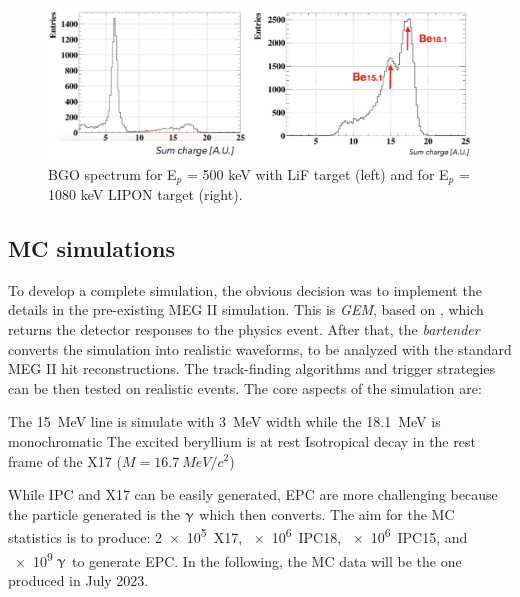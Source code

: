 \begin{refsection}
        \begin{figure}
            \centering
            \includegraphics[width=0.9\linewidth]{Figures//X17//X17_Feb2023/X17_BGO_targets.pdf}
            \caption[X17:BGO LiF and LIPON]{BGO spectrum for E$_p$ = 500 keV with LiF target (left) and  for E$_p$ = 1080 keV LIPON target (right).}
            \label{fig:X17:BGO:targets}
            \end{figure}
            
    \subsection{MC simulations}
        To develop a complete simulation, the obvious decision was to implement the details in the pre-existing MEG II simulation.
        This is \textit{GEM}, based on \gf, which returns the detector responses to the physics event. 
        After that, the \textit{bartender} converts the simulation into realistic waveforms, to be analyzed with the standard MEG II hit reconstructions.
        The track-finding algorithms and trigger strategies can be then tested on realistic events.
        The core aspects of the simulation are:
        \begin{outline}
            \1 The \SI{15}{MeV} line is simulate with \SI{3}{MeV} width
            \1 while the \SI{18.1}{MeV} is monochromatic
            \1 The excited beryllium is at rest
            \1 Isotropical decay in the rest frame of the X17 ($M=\SI{16.7}{MeV/c^2}$)
        \end{outline}     
        While IPC and X17 can be easily generated, EPC are more challenging because the particle generated is the $\upgamma$ which then converts.
        The aim for the MC statistics is to produce: \SI{2e5}{X17}, \SI{e6}{IPC18}, \SI{e6}{IPC15}, and \num{e9} $\upgamma$ to generate EPC.
        In the following, the MC data will be the one produced in July 2023.


\end{refsection}
